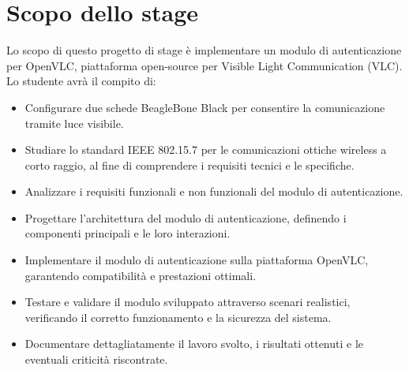 \section*{Scopo dello stage}
Lo scopo di questo progetto di stage è implementare un modulo di autenticazione per OpenVLC, piattaforma open-source per Visible Light Communication (VLC).\\

Lo studente avrà il compito di:
\begin{itemize}
    \item Configurare due schede BeagleBone Black per consentire la comunicazione tramite luce visibile.
    \item Studiare lo standard IEEE 802.15.7 per le comunicazioni ottiche wireless a corto raggio, al fine di comprendere i requisiti tecnici e le specifiche.
    \item Analizzare i requisiti funzionali e non funzionali del modulo di autenticazione.
    \item Progettare l'architettura del modulo di autenticazione, definendo i componenti principali e le loro interazioni.
    \item Implementare il modulo di autenticazione sulla piattaforma OpenVLC, garantendo compatibilità e prestazioni ottimali.
    \item Testare e validare il modulo sviluppato attraverso scenari realistici, verificando il corretto funzionamento e la sicurezza del sistema.
    \item Documentare dettagliatamente il lavoro svolto, i risultati ottenuti e le eventuali criticità riscontrate.
\end{itemize}
